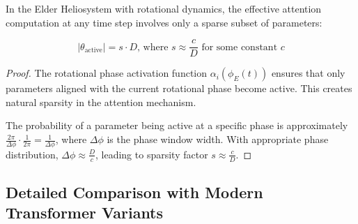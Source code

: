 \begin{theorem}
In the Elder Heliosystem with rotational dynamics, the effective attention computation at any time step involves only a sparse subset of parameters:

\begin{equation}
|\theta_{\text{active}}| = s \cdot D \textrm{, where } s \approx \frac{c}{D} \textrm{ for some constant } c
\end{equation}
\end{theorem}

\begin{proof}
The rotational phase activation function $\alpha_i(\phi_E(t))$ ensures that only parameters aligned with the current rotational phase become active. This creates natural sparsity in the attention mechanism.

The probability of a parameter being active at a specific phase is approximately $\frac{2\pi}{\Delta\phi} \cdot \frac{1}{2\pi} = \frac{1}{\Delta\phi}$, where $\Delta\phi$ is the phase window width. With appropriate phase distribution, $\Delta\phi \approx \frac{D}{c}$, leading to sparsity factor $s \approx \frac{c}{D}$.
\end{proof}

\subsection{Detailed Comparison with Modern Transformer Variants}

